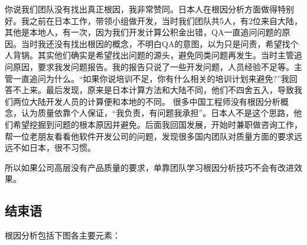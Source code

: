 
你说我们团队没有找出真正根因，我非常赞同。日本人在根因分析方面做得特别好。我之前在日本工作，带领小组做开发，当时我们团队共5人，有2位来自大陆，其他是本地人，有一次，因为我们开发计算公积金出错，QA一直追问问题的原因。当时我还没有找出根因的概念，不明白QA的意图，以为只是问责，希望找个人背锅。其实他们确实是希望找出问题的源头，避免同类问题再发生。当时主管追问原因，要求我发问题报告。我的报告只说了一些开发问题，人员经验不足等。主管一直追问为什么。``如果你说培训不足，你有什么相关的培训计划来避免?''我回答不上来。最后发现，原来是日本计算方法和大陆不同，他们不四舍五入，导致我们两位大陆开发人员的计算便和本地的不同。
很多中国工程师没有根因分析概念，认为质量依靠个人保证，“我负责，有问题我承担”。日本人不是这个思路，他们希望挖掘到问题的根本原因并避免。后面我回国发展，开始时兼职做咨询工作，帮一位老朋友看看他软件开发公司的问题，发现很多国内团队对质量方面的要求远远不如日本，很不习惯。


所以如果公司高层没有产品质量的要求，单靠团队学习根因分析技巧不会有改进效果。

\hypertarget{ux7ed3ux675fux8bed}{%
\subsection{结束语}\label{ux7ed3ux675fux8bed}}

根因分析包括下图各主要元素：

